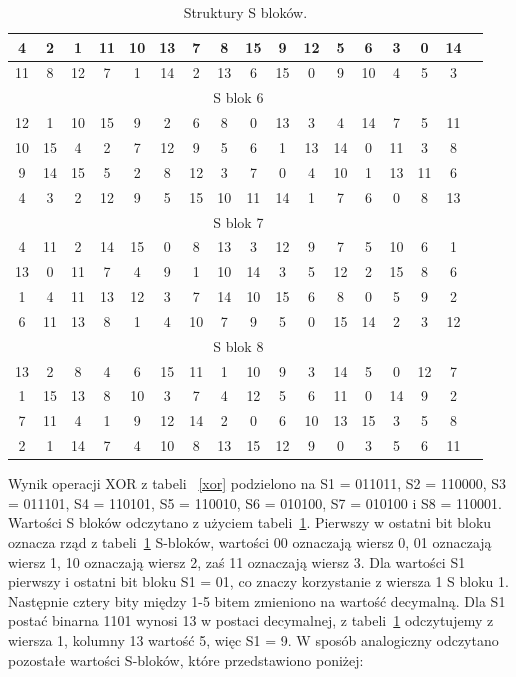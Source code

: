 \documentclass[12p]{article}
\begin{document}
\begin{table}[!h]
\begin{tabular}{|c|c|c|c|c|c|c|c|c|c|c|c|c|c|c|c|c|}
4& 	2& 	1& 	11& 	10& 	13& 	7& 	8& 	15& 	9& 	12& 	5& 	6& 	3& 	0& 	14\\ \hline
11& 	8& 	12& 	7& 	1& 	14& 	2& 	13& 	6& 	15& 	0& 	9& 	10& 	4& 	5& 	3\\ \hline 
\multicolumn{16}{|c|}{S blok 6}\\ \hline
12& 	1& 	10& 	15& 	9& 	2& 	6& 	8& 	0& 	13& 	3& 	4& 	14& 	7& 	5& 	11\\ \hline
10 &	15& 	4& 	2& 	7& 	12& 	9& 	5& 	6& 	1& 	13& 	14& 	0& 	11& 	3& 	8\\ \hline
9& 	14& 	15& 	5& 	2& 	8& 	12& 	3& 	7& 	0& 	4& 	10& 	1& 	13& 	11& 	6\\ \hline
4& 	3& 	2& 	12& 	9& 	5& 	15& 	10& 	11& 	14& 	1& 	7& 	6& 	0& 	8& 	13\\ \hline
\multicolumn{16}{|c|}{S blok 7}\\ \hline
4& 	11& 	2& 	14& 	15& 	0& 	8& 	13& 	3& 	12& 	9& 	7& 	5& 	10& 	6& 	1\\ \hline
13& 	0& 	11& 	7& 	4& 	9& 	1& 	10& 	14& 	3& 	5& 	12& 	2& 	15& 	8& 	6\\ \hline
1& 	4& 	11& 	13& 	12& 	3& 	7& 	14& 	10& 	15& 	6& 	8& 	0& 	5& 	9& 	2\\ \hline
6& 	11& 	13& 	8& 	1& 	4& 	10& 	7& 	9& 	5& 	0& 	15& 	14& 	2& 	3& 	12\\ \hline 
\multicolumn{16}{|c|}{S blok 8}\\ \hline
13& 	2& 	8& 	4& 	6& 	15& 	11& 	1& 	10& 	9& 	3& 	14& 	5& 	0& 	12& 	7\\ \hline
1& 	15& 	13& 	8& 	10& 	3& 	7& 	4& 	12& 	5& 	6& 	11& 	0& 	14& 	9& 	2\\ \hline
7& 	11& 	4& 	1& 	9& 	12& 	14& 	2& 	0& 	6& 	10& 	13& 	15& 	3& 	5& 	8\\ \hline
2& 	1& 	14& 	7& 	4& 	10& 	8& 	13& 	15& 	12& 	9& 	0& 	3& 	5& 	6& 	11 \\ \hline
\end{tabular}
\caption{Struktury S bloków.}\label{s_bloki}
\end{table}

Wynik operacji XOR z tabeli ~\ref{xor} podzielono na S1 = 011011, S2 = 110000, S3 = 011101, S4 = 110101, S5 = 110010, S6 = 010100, S7 = 010100 i S8 = 110001. Wartości S bloków odczytano z użyciem tabeli~\ref{s_bloki}. Pierwszy w ostatni bit bloku oznacza rząd z tabeli~\ref{s_bloki} S-bloków, wartości 00 oznaczają wiersz 0, 01 oznaczają wiersz 1, 10 oznaczają wiersz 2, zaś 11 oznaczają wiersz 3. Dla wartości S1 pierwszy i ostatni bit bloku S1 = 01, co znaczy korzystanie z wiersza 1 S bloku 1. Następnie cztery bity między 1-5 bitem zmieniono na wartość decymalną. Dla S1 postać binarna 1101 wynosi 13 w postaci decymalnej, z tabeli~\ref{s_bloki} odczytujemy z wiersza 1, kolumny 13 wartość  5, więc S1 = 9. W sposób analogiczny odczytano pozostałe wartości S-bloków, które przedstawiono poniżej:
 
\end{document}
